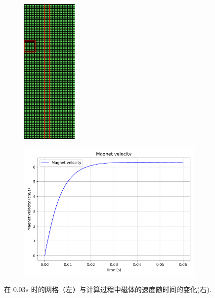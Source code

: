 \begin{figure}[H]
\begin{subfigure}[t]{0.49\linewidth}
    \centering
    \includegraphics[width=0.3\textwidth]{./figures/movingmaxwell/mesh30.pdf}
\end{subfigure}
\begin{subfigure}[t]{0.49\linewidth}
    \centering
    \includegraphics[width=1.0\textwidth]{./figures/movingmaxwell/v.png}
\end{subfigure}
\caption{ 在 $0.03s$ 时的网格（左）与计算过程中磁体的速度随时间的变化(右).}
\end{figure}

